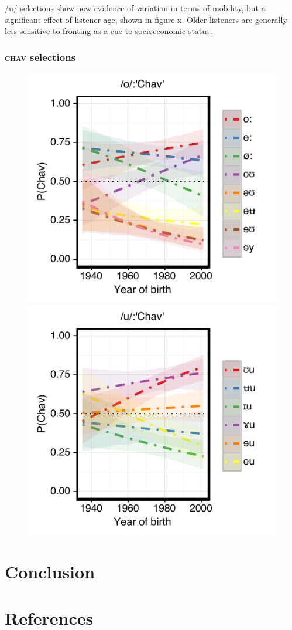 \documentclass[PWPL]{article}
\begin{document}
/u/ selections show now evidence of variation in terms of mobility, but a significant effect of listener age, shown in figure x. Older listeners are generally less sensitive to fronting as a cue to socioeconomic status.
\subsubsection{\textsc{chav} selections}
\begin{figure}[ht]
\centering
\includegraphics[scale=0.8]{ow_chav_age.pdf}
\includegraphics[scale=0.8]{uw_chav_age.pdf}
\end{figure}
\section{Conclusion}
\section{References}

\nocite{*}

\end{document}

